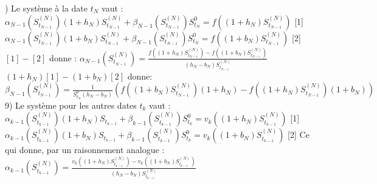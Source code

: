 \documentclass{exam}
\begin{document}
\newline
{}) Le système à la date $t_N$ vaut :
\newline
\vspace{0.5cm}
$\alpha_{N-1}(S_{t_{N-1}}^{(N)})(1 + h_N)S_{t_{N-1}}^{(N)} + \beta_{N-1}(S_{t_{N-1}}^{(N)})S_{t_N}^{0} = f((1+h_N)S_{t_{N-1}}^{(N)})$ \hspace{1cm} [1]
\newline
\vspace{0.5cm}
$\alpha_{N-1}(S_{t_{N-1}}^{(N)})(1+b_N)S_{t_{N-1}}^{(N)} + \beta_{N-1}(S_{t_{N-1}}^{(N)})S_{t_N}^{0} = f((1+b_N)S_{t_{N-1}}^{(N)})$ \hspace{1cm} [2]
\newline
\vspace{0.5cm}
$[1]-[2]$ donne :
\newline
\vspace{0.5cm}
$\alpha_{N-1}(S_{t_{N-1}}^{(N)})=\frac{f((1+h_N)S_{t_{N-1}}^{(N)})-f((1+b_N)S_{t_{N-1}}^{(N)})}{(h_N-b_N)S_{t_{N-1}}^{(N)}}$
\newline
\vspace{0.5cm}
$(1+h_N)[1]-(1+b_N)[2]$ donne:
\newline
\vspace{0.5cm}
$\beta_{N-1}(S_{t_{N-1}}^{(N)})=\frac{1}{S_{t_N}^0(h_N-b_N)}(f((1+b_N)S_{t_{N-1}}^{(N)})(1+h_N)-f((1+h_N)S_{t_{N-1}}^{(N)})(1+b_N))$
\newline
\vspace{0.5cm}
9) Le système pour les autres dates $t_k$ vaut :
\newline
\vspace{0.5cm}
$\alpha_{k-1}(S_{t_{k-1}}^{(N)})(1 + h_N)S_{t_{k-1}} + \beta_{k-1}(S_{t_{k-1}}^{(N)})S_{t_k}^{0} = v_k((1+h_N)S_{t_{k-1}}^{(N)})$ \hspace{1cm} [1]
\newline
\vspace{0.5cm}
$\alpha_{k-1}(S_{t_{k-1}}^{(N)})(1+b_N)S_{t_{k-1}} + \beta_{k-1}(S_{t_{k-1}}^{(N)})S_{t_k}^{0} = v_k((1+b_N)S_{t_{k-1}}^{(N)})$ \hspace{1cm} [2]
\newline
\vspace{0.5cm}
Ce qui donne, par un raisonnement analogue : 
\newline
\vspace{0.5cm}
$\alpha_{k-1}(S_{t_{k-1}}^{(N)})=\frac{v_k((1+h_N)S_{t_{k-1}}^{(N)})-v_k((1+b_N)S_{t_{k-1}}^{(N)})}{(h_N-b_N)S_{t_{k-1}}^{(N)}}$
\newline
\vspace{0.5cm}
\end{document}
